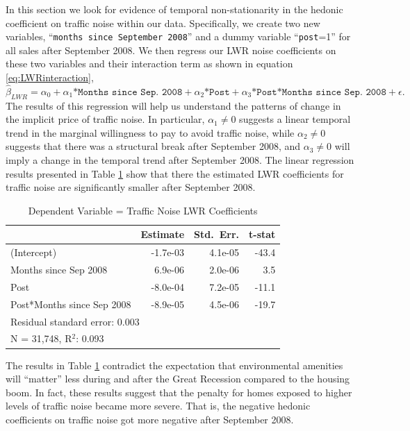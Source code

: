 \documentclass{article}\usepackage[]{graphicx}\usepackage[]{color}
\begin{document}
In this section we look for evidence of temporal non-stationarity in the hedonic coefficient on traffic noise within our data. Specifically, we create two new variables, ``\texttt{months since September 2008}'' and a dummy variable ``\texttt{post}=1'' for all sales after September 2008. We then regress our LWR noise coefficients on these two variables and their interaction term as shown in equation \eqref{eq:LWRinteraction}, 
\begin{equation}\label{eq:LWRinteraction}
\hat{\beta}_{LWR} = \alpha _0 + \alpha _1 \texttt{*Months since Sep. 2008} + \alpha _2  \texttt{*Post} + \alpha _3 \texttt{*Post*Months since Sep. 2008} + \epsilon.
\end{equation}
The results of this regression will help us understand the patterns of change in the implicit price of traffic noise. In particular, $\alpha_1 \neq 0$ suggests a linear temporal trend in the marginal willingness to pay to avoid traffic noise, while $\alpha_2 \neq 0$ suggests that there was a structural break after September 2008, and $\alpha_3 \neq 0$ will imply a change in the temporal trend after September 2008. The linear regression results presented in Table \ref{tab:betaMAX} show that there the estimated LWR coefficients for traffic noise are significantly smaller after September 2008.
\begin{table}
\caption{Dependent Variable = Traffic Noise LWR Coefficients}\label{tab:betaMAX}
\begin{center}
\begin{tabular}{lrrr}
           & Estimate & Std.\ Err. & t-stat  \\  \hline
(Intercept) & -1.7e-03 &  4.1e-05 &  -43.4   \\
Months since Sep 2008       & 6.9e-06 &  2.0e-06  &   3.5    \\
Post        &-8.0e-04 &  7.2e-05  & -11.1    \\
Post*Months since Sep 2008  &-8.9e-05 &  4.5e-06  & -19.7    \\ \hline
\multicolumn{4}{l}{Residual standard error: 0.003} \\
\multicolumn{4}{l}{N = 31,748, R$^2$: 0.093} \\ %
\end{tabular}
\end{center}
\end{table}

The results in Table \ref{tab:betaMAX} contradict the expectation that environmental amenities will ``matter'' less during and after the Great Recession compared to the housing boom. In fact, these results suggest that the penalty for homes exposed to higher levels of traffic noise became more severe. That is, the negative hedonic coefficients on traffic noise got more negative after September 2008.  
\end{document}
